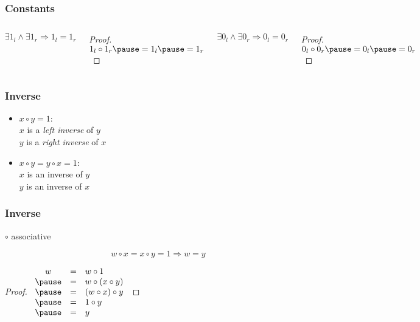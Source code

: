 \documentclass[dvipsnames]{beamer}
\begin{document}
\begin{frame}
  \frametitle{Constants}

  \begin{columns}
    \begin{theorem}
      \[ \exists 1_l \wedge \exists 1_r \Rightarrow 1_l = 1_r \]
    \end{theorem}

    \pause
    \begin{proof}
      $1_l \circ 1_r \pause = 1_l \pause = 1_r$
    \end{proof}

    \pause
    \begin{theorem}
      \[ \exists 0_l \wedge \exists 0_r \Rightarrow 0_l = 0_r \]
    \end{theorem}

    \pause
    \begin{proof}
      $0_l \circ 0_r \pause = 0_l \pause = 0_r$
    \end{proof}
  \end{columns}
\end{frame}

\begin{frame}
  \frametitle{Inverse}

  \begin{itemize}
    \item $x \circ y = 1$:\\
      $x$ is a \emph{left inverse} of $y$\\
      $y$ is a \emph{right inverse} of $x$

    \pause
    \medskip
    \item $x \circ y = y \circ x = 1$:\\
      $x$ is an \alert{inverse} of $y$\\
      $y$ is an inverse of $x$\\
  \end{itemize}
\end{frame}

\begin{frame}
  \frametitle{Inverse}

  \begin{theorem}
    $\circ$ associative

    \[ w \circ x = x \circ y = 1 \Rightarrow w = y \]
  \end{theorem}

  \pause
  \begin{proof}
    $\begin{array}{ccl}
      w & = & w \circ 1\\ \pause
        & = & w \circ (x \circ y)\\ \pause
        & = & (w \circ x) \circ y\\ \pause
        & = & 1 \circ y\\ \pause
        & = & y
    \end{array}$
  \end{proof}
\end{frame}
\end{document}
